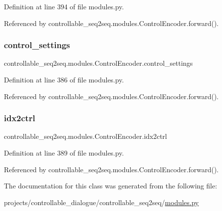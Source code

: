 Definition at line 394 of file modules.\+py.



Referenced by controllable\+\_\+seq2seq.\+modules.\+Control\+Encoder.\+forward().

\mbox{\label{classcontrollable__seq2seq_1_1modules_1_1ControlEncoder_ada06d98cdb802bdc1a1ee58d7a2500f8}} 
\subsubsection{\texorpdfstring{control\+\_\+settings}{control\_settings}}
{\footnotesize\ttfamily controllable\+\_\+seq2seq.\+modules.\+Control\+Encoder.\+control\+\_\+settings}



Definition at line 386 of file modules.\+py.



Referenced by controllable\+\_\+seq2seq.\+modules.\+Control\+Encoder.\+forward().

\mbox{\label{classcontrollable__seq2seq_1_1modules_1_1ControlEncoder_a424e293e34037eef998d7281f82d7d6c}} 
\subsubsection{\texorpdfstring{idx2ctrl}{idx2ctrl}}
{\footnotesize\ttfamily controllable\+\_\+seq2seq.\+modules.\+Control\+Encoder.\+idx2ctrl}



Definition at line 389 of file modules.\+py.



Referenced by controllable\+\_\+seq2seq.\+modules.\+Control\+Encoder.\+forward().



The documentation for this class was generated from the following file\+:\begin{DoxyCompactItemize}
\item 
projects/controllable\+\_\+dialogue/controllable\+\_\+seq2seq/\hyperlink{projects_2controllable__dialogue_2controllable__seq2seq_2modules_8py}{modules.\+py}\end{DoxyCompactItemize}

